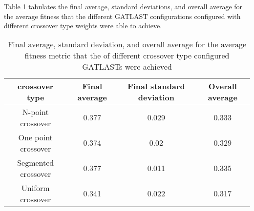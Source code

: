 Table \ref{tab:HP:GA:crossOverType:average fitness} tabulates the final average, standard deviations, and overall average for the average fitness that the different GATLAST configurations configured with different crossover type weights were able to achieve.
\begin{table}[tbh!]
\centering
\begin{adjustbox}{trim=0cm 0cm 0cm 0cm, clip=true}
\begin{tabular}{|c|c|c|c|}
\hline
crossover type & Final average & Final standard deviation & Overall average\\
\hline
N-point crossover & 0.377 & 0.029 & 0.333\\\hline
One point crossover & 0.374 & 0.02 & 0.329\\\hline
Segmented crossover & 0.377 & 0.011 & 0.335\\\hline
Uniform crossover & 0.341 & 0.022 & 0.317\\\hline
\end{tabular}
\end{adjustbox}
\caption{Final average, standard deviation, and overall average for the average fitness metric that the of different crossover type configured GATLASTs were achieved}
\label{tab:HP:GA:crossOverType:average fitness}
\end{table}